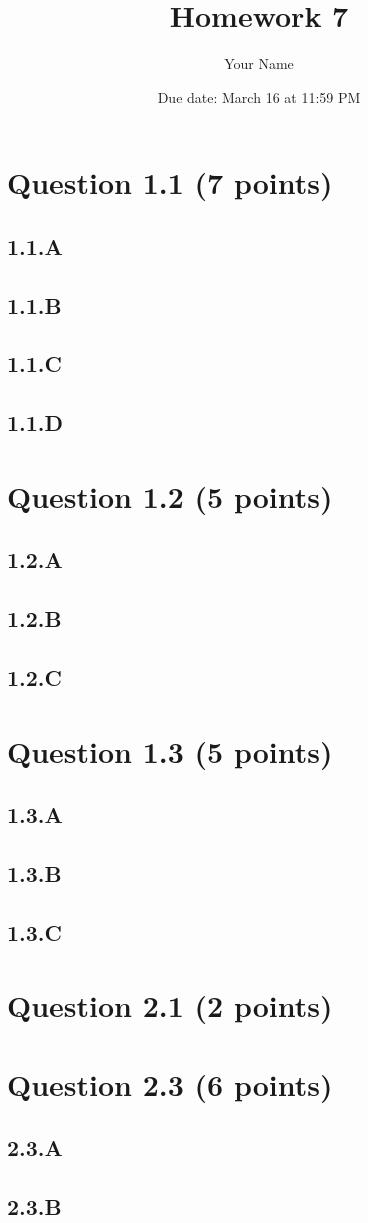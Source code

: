 \documentclass{article}
\title{Homework 7}
\author{Your Name}
\date{Due date: March 16 at 11:59 PM}
\begin{document}
\maketitle
\section*{Question 1.1 (7 points)}
\subsection*{1.1.A}
\subsection*{1.1.B}
\subsection*{1.1.C}
\subsection*{1.1.D}
\section*{Question 1.2 (5 points)}
\subsection*{1.2.A}
\subsection*{1.2.B}
\subsection*{1.2.C}
\section*{Question 1.3 (5 points)}
\subsection*{1.3.A}
\subsection*{1.3.B}
\subsection*{1.3.C}
\section*{Question 2.1 (2 points)}
\section*{Question 2.3 (6 points)}
\subsection*{2.3.A}
\subsection*{2.3.B}
\end{document}
